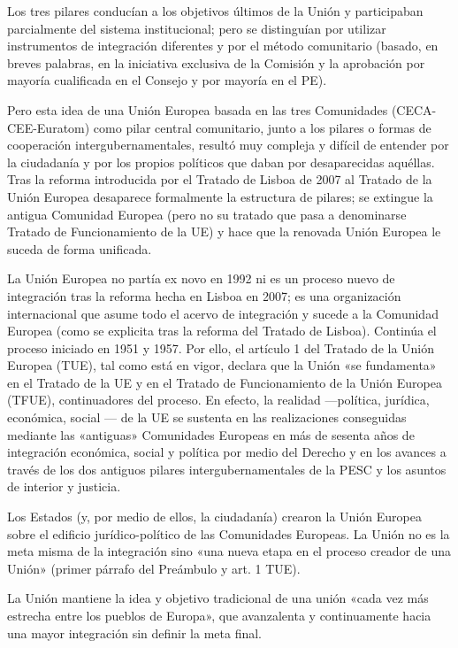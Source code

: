 \documentclass[10pt,a4paper]{article}
\begin{document}
Los tres pilares conducían a los objetivos últimos de la Unión y participaban parcialmente del sistema institucional; pero se distinguían por utilizar instrumentos de integración diferentes y por el método comunitario (basado, en breves palabras, en la iniciativa exclusiva de la Comisión y la aprobación por mayoría cualificada en el Consejo y por mayoría en el PE).

Pero esta idea de una Unión Europea basada en las tres Comunidades (CECA-CEE-Euratom) como pilar central comunitario, junto a los pilares o formas de cooperación intergubernamentales, resultó muy compleja y difícil de entender por la ciudadanía y por los propios políticos que daban por desaparecidas aquéllas. Tras la reforma introducida por el Tratado de Lisboa de 2007 al Tratado de la Unión Europea desaparece formalmente la estructura de pilares; se extingue la antigua Comunidad Europea (pero no su tratado que pasa a denominarse Tratado de Funcionamiento de la UE) y hace que la renovada Unión Europea le suceda de forma unificada.

La Unión Europea no partía ex novo en 1992 ni es un proceso nuevo de integración tras la reforma hecha en Lisboa en 2007; es una organización internacional que asume todo el acervo de integración y sucede a la Comunidad Europea (como se explicita tras la reforma del Tratado de Lisboa). Continúa el proceso iniciado en 1951 y 1957. Por ello, el artículo 1 del Tratado de la Unión Europea (TUE), tal como está en vigor, declara que la Unión «se fundamenta» en el Tratado de la UE y en el Tratado de Funcionamiento de la Unión Europea (TFUE), continuadores del proceso. En efecto, la realidad —política, jurídica, económica, social — de la UE se sustenta en las realizaciones conseguidas mediante las «antiguas» Comunidades Europeas en más de sesenta años de integración económica, social y política por medio del Derecho y en los avances a través de los dos antiguos pilares intergubernamentales de la PESC y los asuntos de interior y justicia. 

Los Estados (y, por medio de ellos, la ciudadanía) crearon la Unión Europea sobre el edificio jurídico-político de las Comunidades Europeas. La Unión no es la meta misma de la integración sino «una nueva etapa en el proceso creador de una Unión» (primer párrafo del Preámbulo y art. 1 TUE).

La Unión mantiene la idea y objetivo tradicional de una unión «cada vez más estrecha entre los pueblos de Europa», que avanzalenta y continuamente hacia una mayor integración sin definir la meta final.
\end{document}
